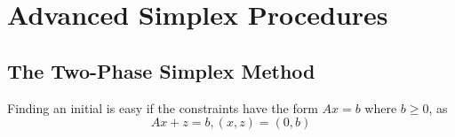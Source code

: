 
\chapter{Advanced Simplex Procedures}
\label{cha:advanc-simpl-proc}

\section{The Two-Phase Simplex Method}
\label{sec:two-phase-simplex}

Finding an initial \bfs is easy if the constraints have the form $Ax =
b$ where $b \geq 0$, as
\begin{equation}
  \label{eq:22}
  Ax + z = b, (x, z) = (0, b)
\end{equation}


